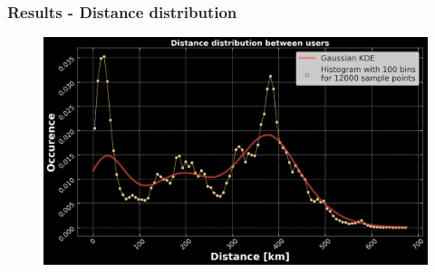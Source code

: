\begin{frame}
\frametitle{Results - Distance distribution}

\begin{figure}
	\includegraphics[width=\textwidth]{./images/distance_dist_of_12000_points_w_kde.png}
\end{figure}

\end{frame}